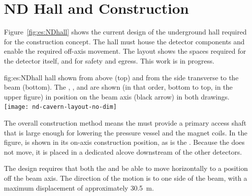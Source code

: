 \section{ND Hall and Construction}
\label{sec:exsum-nd-hall}
%

Figure~\ref{fig:es:NDhall} shows the current design of the underground hall required for the   construction concept. The hall must house the detector components and enable the required off-axis movement. The layout shows the spaces required for the detector itself, and for safety and egress.  This  work is in progress. 


\begin{dunefigure}{fig:es:NDhall}
{   hall shown from above (top) and from the side transverse to the beam (bottom). The , , and  are shown (in that order, bottom to top, in the upper figure) in position on the beam axis (black arrow) in both drawings. }
\texttt{[image: nd-cavern-layout-no-dim]}
\end{dunefigure}

The overall construction method means the  must %
provide a primary access shaft that is large enough for lowering the pressure vessel and the magnet coils. In the figure,  is shown in its on-axis construction position, %
as is the . %
Because the  does not  move, it is placed in a dedicated alcove downstream of the other  detectors.

The  design requires that both the  and  be able to  move horizontally to a position off the beam axis. The direction of the motion is to one side of the beam, with a maximum displacement of approximately \SI{30.5}{m}. 